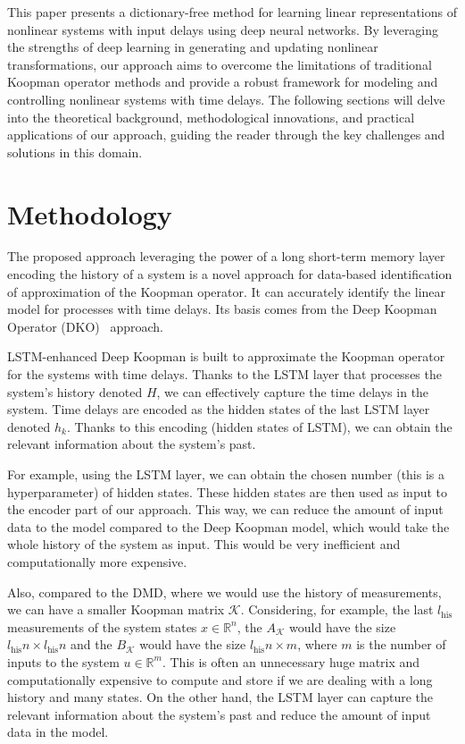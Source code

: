 \documentclass[conference]{IEEEtran}
\newcommand{\ui}[2]{#1_{\text{#2}}}
\begin{document}
This paper presents a dictionary-free method for learning linear representations of nonlinear systems with input delays using deep neural networks. By leveraging the strengths of deep learning in generating and updating nonlinear transformations, our approach aims to overcome the limitations of traditional Koopman operator methods and provide a robust framework for modeling and controlling nonlinear systems with time delays. The following sections will delve into the theoretical background, methodological innovations, and practical applications of our approach, guiding the reader through the key challenges and solutions in this domain.

\section{Methodology}

The proposed approach leveraging the power of a long short-term memory layer encoding the history of a system is a novel approach for data-based identification of approximation of the Koopman operator. It can accurately identify the linear model for processes with time delays. Its basis comes from the Deep Koopman Operator (DKO)~\cite{lusch2018deep} approach.

LSTM-enhanced Deep Koopman is built to approximate the Koopman operator for the systems with time delays. Thanks to the LSTM layer that processes the system's history denoted \(H\), we can effectively capture the time delays in the system. Time delays are encoded as the hidden states of the last LSTM layer denoted \(h_k\). Thanks to this encoding (hidden states of LSTM), we can obtain the relevant information about the system's past.

For example, using the LSTM layer, we can obtain the chosen number (this is a hyperparameter) of hidden states. These hidden states are then used as input to the encoder part of our approach. This way, we can reduce the amount of input data to the model compared to the Deep Koopman model, which would take the whole history of the system as input. This would be very inefficient and computationally more expensive.

Also, compared to the DMD, where we would use the history of measurements, we can have a smaller Koopman matrix \(\mathcal{K}\). Considering, for example, the last \(\ui{l}{his}\) measurements of the system states \(x \in \mathbb{R}^n\), the \(A_\mathcal{K}\) would have the size \(\ui{l}{his}n \times \ui{l}{his}n\) and the \(B_\mathcal{K}\) would have the size \(\ui{l}{his}n \times m\),  where \(m\) is the number of inputs to the system \(u \in \mathbb{R}^m\). This is often an unnecessary huge matrix and computationally expensive to compute and store if we are dealing with a long history and many states. On the other hand, the LSTM layer can capture the relevant information about the system's past and reduce the amount of input data in the model.
\end{document}

